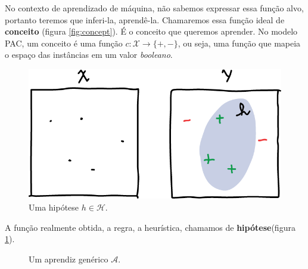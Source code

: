 \documentclass[
10pt, %
a4paper, %
onecolumn, %
]{article}
\begin{document}
No contexto de aprendizado de máquina, não sabemos expressar essa função alvo, portanto teremos que inferi-la, aprendê-la. Chamaremos essa função ideal de \textbf{conceito} (figura \ref{fig:concept}). É o conceito que queremos aprender. No modelo PAC, um conceito é uma função $c: \mathcal{X} \to \{+,-\}$, ou seja, uma função que mapeia o espaço das instâncias em um valor \emph{booleano}.


\begin{figure}[!htp]
    \centering
    \includegraphics[width=.5\textwidth]{hypothesis}
    \caption{Uma hipótese $h \in \mathcal{H}$.}
    \label{fig:hypothesis}
\end{figure}


A função realmente obtida, a regra, a heurística, chamamos de \textbf{hipótese}(figura \ref{fig:hypothesis}). 

\begin{figure}[!htp]
    \centering
    \caption{Um aprendiz genérico $\mathcal{A}$.}
    \label{fig:diagram}
  \end{figure}
\end{document}

